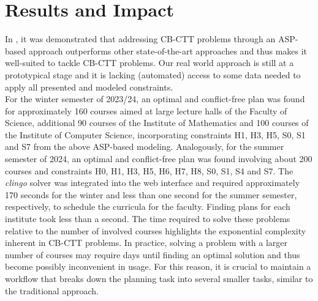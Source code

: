 \documentclass{easychair}
\newcommand{\CBCTT}{CB-CTT}
\newcommand{\ASP}{ASP}
\newcommand{\clingo}{\textit{clingo}}
\begin{document}
\section{Results and Impact}
\label{sec:impact}
  In \cite{bainkaokscsotawa18a}, it was demonstrated that addressing \CBCTT{} problems through an \ASP{}-based approach outperforms other state-of-the-art approaches and thus makes it well-suited to tackle \CBCTT{} problems. 
  Our real world approach is still at a prototypical stage and it is lacking (automated) access to some data needed to apply all presented and modeled constraints. \\
  For the winter semester of 2023/24, an optimal and conflict-free plan was found for approximately 160 courses aimed at large lecture halls of the Faculty of Science, additional 90 courses of the Institute of Mathematics and 100 courses of the Institute of Computer Science, incorporating constraints H1, H3, H5, S0, S1 and S7 from the above \ASP{}-based modeling. 
  Analogously, for the summer semester of 2024, an optimal and conflict-free plan was found involving about 200 courses and constraints H0, H1, H3, H5, H6, H7, H8, S0, S1, S4 and S7.  
  The \clingo{} solver was integrated into the web interface and required approximately  170 seconds for the winter and less than one second for the summer semester, respectively, to schedule the curricula for the faculty. 
  Finding plans for each institute took less than a second. 
  The time required to solve these problems relative to the number of involved courses highlights the exponential complexity inherent in \CBCTT{} problems.
  In practice, solving a problem with a larger number of courses may require days until finding an optimal solution and thus become possibly inconvenient in usage.
  For this reason, it is crucial to maintain a workflow that breaks down the planning task into several smaller tasks, similar to the traditional approach. \\
\end{document}

